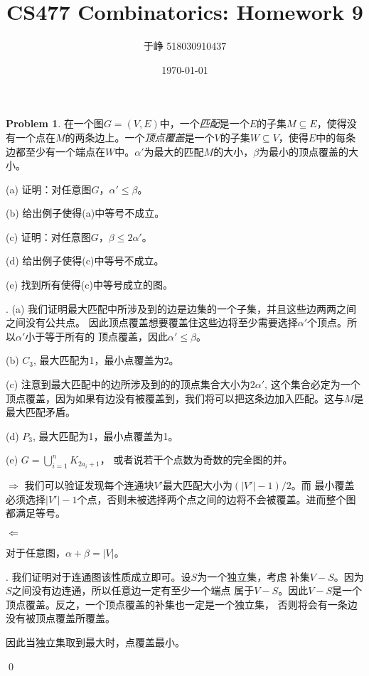 \documentclass[UTF8]{ctexart}
\newenvironment{sol}
  {\par\vspace{3mm}\noindent{\it Solution}.}
  {\qed \\ \medskip}
\theoremstyle{definition}
\newtheorem{problem}{Problem}
\begin{document}
\title{CS477 Combinatorics: Homework 9}
\author{于峥 518030910437}
\date{\today}

\maketitle

\begin{problem}
{在一个图$G=(V, E)$中，一个{\em 匹配}是一个$E$的子集$M \subseteq E$，使得没有一个点在$M$的两条边上。一个{\em 顶点覆盖}是一个$V$的子集$W \subseteq V$，使得$E$中的每条边都至少有一个端点在$W$中。$\alpha'$为最大的匹配$M$的大小，$\beta$为最小的顶点覆盖的大小。}

(a) 证明：对任意图$G$，$\alpha' \leq \beta$。

(b) 给出例子使得(a)中等号不成立。

(c) 证明：对任意图$G$，$\beta \leq 2 \alpha'$。

(d) 给出例子使得(c)中等号不成立。

(e) 找到所有使得(c)中等号成立的图。
\begin{sol}
    (a) 我们证明最大匹配中所涉及到的边是边集的一个子集，并且这些边两两之间之间没有公共点。
    因此顶点覆盖想要覆盖住这些边将至少需要选择$\alpha'$个顶点。所以$\alpha'$小于等于所有的
    顶点覆盖，因此$\alpha' \leq \beta$。

    (b) $C_3$, 最大匹配为1，最小点覆盖为2。

    (c) 注意到最大匹配中的边所涉及到的的顶点集合大小为$2\alpha'$, 这个集合必定为一个
    顶点覆盖，因为如果有边没有被覆盖到，我们将可以把这条边加入匹配。这与$M$是最大匹配矛盾。

    (d) $P_3$, 最大匹配为1，最小点覆盖为1。

    (e) $G = \bigcup_{i=1}^nK_{2a_i+1}$， 或者说若干个点数为奇数的完全图的并。
    
    $\Rightarrow$ 我们可以验证发现每个连通块$V'$最大匹配大小为$(|V'|-1)/2$。而
    最小覆盖必须选择$|V'|-1$个点，否则未被选择两个点之间的边将不会被覆盖。进而整个图
    都满足等号。


    $\Leftarrow$
    \begin{lemma}
        对于任意图，$\alpha + \beta = |V|$。
        
        . 我们证明对于连通图该性质成立即可。设$S$为一个独立集，考虑
        补集$V-S$。因为$S$之间没有边连通，所以任意边一定有至少一个端点
        属于$V-S$。因此$V-S$是一个顶点覆盖。反之，一个顶点覆盖的补集也一定是一个独立集，
        否则将会有一条边没有被顶点覆盖所覆盖。

        因此当独立集取到最大时，点覆盖最小。
    \end{lemma}


\end{sol}
\end{problem}
\end{document}
